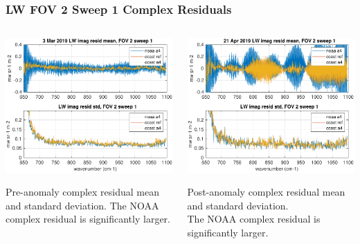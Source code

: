 \documentclass[10pt]{beamer}
\begin{document}
\begin{frame}
\frametitle{LW FOV 2 Sweep 1 Complex Residuals}
\begin{columns}[t]
\begin{column}{0.5\textwidth}
  \begin{centering}
  \includegraphics[width=\textwidth]{figures/LW_pre_fail_imag_fov2_sd1.pdf}
  \end{centering}\vspace{3mm}
  Pre-anomaly complex residual mean and standard deviation.  The
  NOAA complex residual is significantly larger.

\end{column}
\begin{column}{0.5\textwidth}  
  \begin{centering}
  \includegraphics[width=\textwidth]{figures/LW_post_fail_imag_fov2_sd1.pdf}
  \end{centering}\vspace{3mm}
  Post-anomaly complex residual mean and standard deviation.  \\The
  NOAA complex residual is significantly larger.


\end{column}
\end{columns}
\end{frame}
\end{document}
